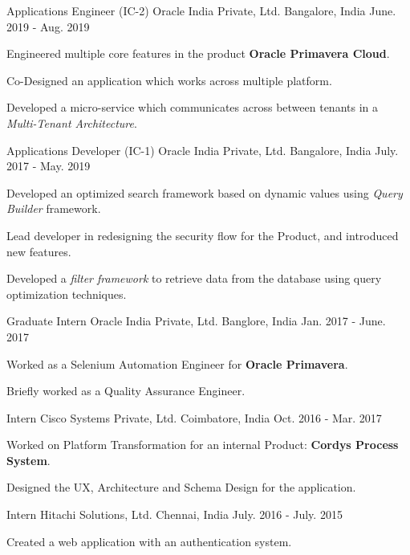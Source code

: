 \begin{cventries}
  \cventry
    {Applications Engineer (IC-2)}
    {Oracle India Private, Ltd.}
    {Bangalore, India}
    {June. 2019 - Aug. 2019}
    {
      \begin{cvitems}
        \item {Engineered multiple core features in the product \textbf{Oracle Primavera Cloud}.}
        \item {Co-Designed an application which works across multiple platform.}
        \item {Developed a micro-service which communicates across between tenants in a \textit{Multi-Tenant Architecture}.}
      \end{cvitems}
    }
  \cventry
    {Applications Developer (IC-1)}
    {Oracle India Private, Ltd.}
    {Bangalore, India}
    {July. 2017 - May. 2019}
    {
      \begin{cvitems}
        \item {Developed an optimized search framework based on dynamic values using \textit{Query Builder} framework.}
        \item {Lead developer in redesigning the security flow for the Product, and introduced new features.}
        \item {Developed a \textit{filter framework} to retrieve data from the database using query optimization techniques.}
      \end{cvitems}
    }
  \cventry
    {Graduate Intern}
    {Oracle India Private, Ltd.}
    {Banglore, India}
    {Jan. 2017 - June. 2017}
    {
      \begin{cvitems}
        \item {Worked as a Selenium Automation Engineer for \textbf{Oracle Primavera}.}
        \item {Briefly worked as a Quality Assurance Engineer.}
      \end{cvitems}
    }
  \cventry
    {Intern}
    {Cisco Systems Private, Ltd.}
    {Coimbatore, India}
    {Oct. 2016 - Mar. 2017}
    {
      \begin{cvitems}
        \item {Worked on Platform Transformation for an internal Product: \textbf{Cordys Process System}.}
        \item {Designed the UX, Architecture and Schema Design for the application.}
      \end{cvitems} 
    }
  \cventry
    {Intern}
    {Hitachi Solutions, Ltd.}
    {Chennai, India}
    {July. 2016 - July. 2015}
    {
      \begin{cvitems}
        \item {Created a web application with an authentication system.}    
      \end{cvitems}
    }
\end{cventries}